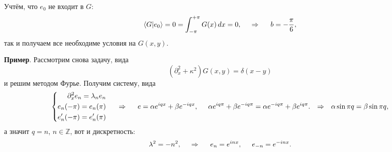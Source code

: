 Учтём, что $e_0$ не входит в $G$:
\begin{equation*}
    \langle G | e_0\rangle = 0 = \int_{-\pi}^{+\pi}G(x) \, d x = 0,
    \hspace{0.5cm} \Rightarrow \hspace{0.5cm}
    b = - \frac{\pi}{6},
\end{equation*}
так и получаем все необходиме условия на $G(x, y)$. 




\textbf{Пример}. Рассмотрим снова задачу, вида
\begin{equation*}
    (\partial_x^2 + \kappa^2) G(x, y) = \delta(x-y)
\end{equation*}
и решим методом Фурье. Получим систему, вида
\begin{equation*}
    \left\{\begin{aligned}
        \partial_x^2 e_n = \lambda_n e_n \\
        e_n (-\pi) = e_n (\pi) \\ 
        e_n'(-\pi) = e_n'(\pi) \\
    \end{aligned}\right.
    \hspace{0.5cm} \Rightarrow \hspace{0.5cm}
    e = \alpha e^{i q x} + \beta e^{- i q x}, 
    \hspace{5 mm} 
    \alpha e^{i q \pi} + \beta e^{- i q \pi} = \alpha e^{- i q \pi} + \beta e^{i q \pi}.
    \hspace{0.25cm} \Rightarrow \hspace{0.25cm}
    \alpha \sin \pi q = \beta \sin \pi q,
\end{equation*}
а значит $q = n$, $n \in \mathbb{Z}$, вот и дискретность:
\begin{equation*}
    \lambda^2 = - n^2,
    \hspace{0.5cm} \Rightarrow \hspace{0.5cm}
    e_n = e^{i n x}, \hspace{5 mm} 
    e_{-n} = e^{- i nx}.
\end{equation*} 
